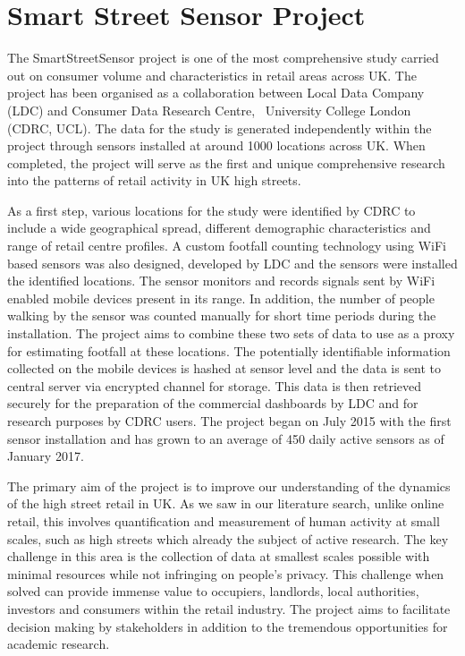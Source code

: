 \section{Smart Street Sensor Project}

The SmartStreetSensor project is one of the most comprehensive study carried out on consumer volume and characteristics in retail areas across UK.
The project has been organised as a collaboration between Local Data Company (LDC) and Consumer Data Research Centre,  University College London (CDRC, UCL).
The data for the study is generated independently within the project through sensors installed at around 1000 locations across UK.
When completed, the project will serve as the first and unique comprehensive research into the patterns of retail activity in UK high streets.

As a first step, various locations for the study were identified by CDRC to include a wide geographical spread, different demographic characteristics and range of retail centre profiles.
A custom footfall counting technology using WiFi based sensors was also designed, developed by LDC and the sensors were installed the identified locations.
The sensor monitors and records signals sent by WiFi enabled mobile devices present in its range.
In addition, the number of people walking by the sensor was counted manually for short time periods during the installation.
The project aims to combine these two sets of data to use as a proxy for estimating footfall at these locations.
The potentially identifiable information collected on the mobile devices is hashed at sensor level and the data is sent to central server via encrypted channel for storage.
This data is then retrieved securely for the preparation of the commercial dashboards by LDC and for research purposes by CDRC users.
The project began on July 2015 with the first sensor installation and has grown to an average of 450 daily active sensors as of January 2017.

The primary aim of the project is to improve our understanding of the dynamics of the high street retail in UK.
As we saw in our literature search, unlike online retail, this involves quantification and measurement of human activity at small scales, such as high streets which already the subject of active research.
The key challenge in this area is the collection of data at smallest scales possible with minimal resources while not infringing on people’s privacy.
This challenge when solved can provide immense value to occupiers, landlords, local authorities, investors and consumers within the retail industry.
The project aims to facilitate decision making by stakeholders in addition to the tremendous opportunities for academic research.

